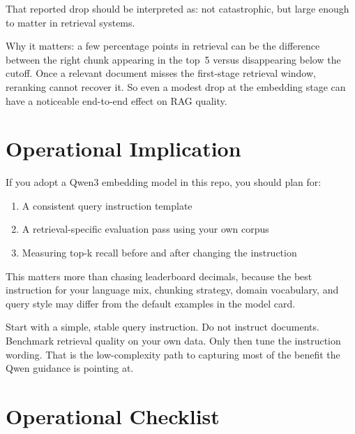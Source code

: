 That reported drop should be interpreted as: not catastrophic, but large enough to matter
in retrieval systems.

Why it matters: a few percentage points in retrieval can be the difference between the right
chunk appearing in the top~5 versus disappearing below the cutoff. Once a relevant document
misses the first-stage retrieval window, reranking cannot recover it. So even a modest drop
at the embedding stage can have a noticeable end-to-end effect on RAG quality.

\section{Operational Implication}

If you adopt a Qwen3 embedding model in this repo, you should plan for:

\begin{enumerate}
    \item A consistent query instruction template
    \item A retrieval-specific evaluation pass using your own corpus
    \item Measuring top-k recall before and after changing the instruction
\end{enumerate}

This matters more than chasing leaderboard decimals, because the best instruction for your
language mix, chunking strategy, domain vocabulary, and query style may differ from the
default examples in the model card.

\begin{notebox}
Start with a simple, stable query instruction. Do not instruct documents. Benchmark retrieval
quality on your own data. Only then tune the instruction wording. That is the low-complexity
path to capturing most of the benefit the Qwen guidance is pointing at.
\end{notebox}

\section{Operational Checklist}

